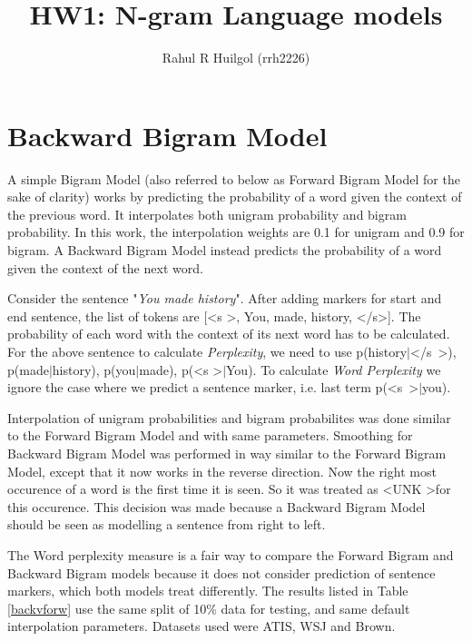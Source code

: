 \documentclass{article}
\begin{document}
\title{\vspace{-4ex}HW1: N-gram Language models}
\author{Rahul R Huilgol (rrh2226)}
\maketitle

\section{Backward Bigram Model}
A simple Bigram Model (also referred to below as Forward Bigram Model for the sake of clarity) works by predicting the probability of a word given the context of the previous word. It interpolates both unigram probability and bigram probability. In this work, the interpolation weights are 0.1 for unigram and 0.9 for bigram. A Backward Bigram Model instead predicts the probability of a word given the context of the next word. 

Consider the sentence "\textit{You made history}". After adding markers for start and end sentence, the list of tokens are [\textless s \textgreater, You, made, history, \textless/s\textgreater]. The probability of each word with the context of its next word has to be calculated.  For the above sentence to calculate \textit{Perplexity}, we need to use p(history$|$\textless/s\ \textgreater), p(made$|$history), p(you$|$made), p(\textless s \textgreater$|$You). To calculate \textit{Word Perplexity} we ignore the case where we predict a sentence marker, i.e. last term p(\textless s\ \textgreater$|$you). 

Interpolation of unigram probabilities and bigram probabilites was done similar to the Forward Bigram Model and with same parameters. Smoothing for Backward Bigram Model was performed in way similar to the Forward Bigram Model, except that it now works in the reverse direction. Now the right most occurence of a word is the first time it is seen. So it was treated as \textless UNK \textgreater for this occurence. This decision was made because a Backward Bigram Model should be seen as modelling a sentence from right to left. 

The Word perplexity measure is a fair way to compare the Forward Bigram and Backward Bigram models because it does not consider prediction of sentence markers, which both models treat  differently. The results listed in Table \ref{backvforw} use the same split of 10\% data for testing, and same default interpolation parameters. Datasets used were ATIS, WSJ and Brown.
\end{document}

